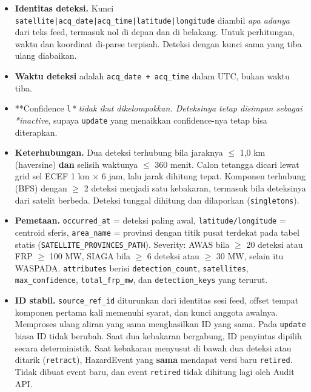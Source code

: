 \begin{itemize}
\item \textbf{Identitas deteksi.} Kunci \texttt{satellite|\allowbreak{}acq\_\allowbreak{}date|\allowbreak{}acq\_\allowbreak{}time|\allowbreak{}latitude|\allowbreak{}longitude} diambil \emph{apa adanya} dari teks feed, termasuk nol di depan dan di belakang. Untuk perhitungan, waktu dan koordinat di-parse terpisah. Deteksi dengan kunci sama yang tiba ulang diabaikan.
\item \textbf{Waktu deteksi} adalah \texttt{acq\_\allowbreak{}date + acq\_\allowbreak{}time} dalam UTC, bukan waktu tiba.
\item **Confidence \texttt{l}\emph{* tidak ikut dikelompokkan. Deteksinya tetap disimpan sebagai *inactive}, supaya \texttt{update} yang menaikkan confidence-nya tetap bisa diterapkan.
\item \textbf{Keterhubungan.} Dua deteksi terhubung bila jaraknya $\le$ 1,0 km (haversine) \textbf{dan} selisih waktunya $\le$ 360 menit. Calon tetangga dicari lewat grid sel ECEF 1 km $\times$ 6 jam, lalu jarak dihitung tepat. Komponen terhubung (BFS) dengan $\ge$ 2 deteksi menjadi satu kebakaran, termasuk bila deteksinya dari satelit berbeda. Deteksi tunggal dihitung dan dilaporkan (\texttt{singletons}).
\item \textbf{Pemetaan.} \texttt{occurred\_\allowbreak{}at} = deteksi paling awal, \texttt{latitude/\allowbreak{}longitude} = centroid sferis, \texttt{area\_\allowbreak{}name} = provinsi dengan titik pusat terdekat pada tabel statis (\texttt{SATELLITE\_\allowbreak{}PROVINCES\_\allowbreak{}PATH}). Severity: AWAS bila $\ge$ 20 deteksi atau FRP $\ge$ 100 MW, SIAGA bila $\ge$ 6 deteksi atau $\ge$ 30 MW, selain itu WASPADA. \texttt{attributes} berisi \texttt{detection\_\allowbreak{}count}, \texttt{satellites}, \texttt{max\_\allowbreak{}confidence}, \texttt{total\_\allowbreak{}frp\_\allowbreak{}mw}, dan \texttt{detection\_\allowbreak{}keys} yang terurut.
\item \textbf{ID stabil.} \texttt{source\_\allowbreak{}ref\_\allowbreak{}id} diturunkan dari identitas sesi feed, offset tempat komponen pertama kali memenuhi syarat, dan kunci anggota awalnya. Memproses ulang aliran yang sama menghasilkan ID yang sama. Pada \texttt{update} biasa ID tidak berubah. Saat dua kebakaran bergabung, ID penyintas dipilih secara deterministik. Saat kebakaran menyusut di bawah dua deteksi atau ditarik (\texttt{retract}), HazardEvent yang \textbf{sama} mendapat versi baru \texttt{retired}. Tidak dibuat event baru, dan event \texttt{retired} tidak dihitung lagi oleh Audit API.
\end{itemize}


